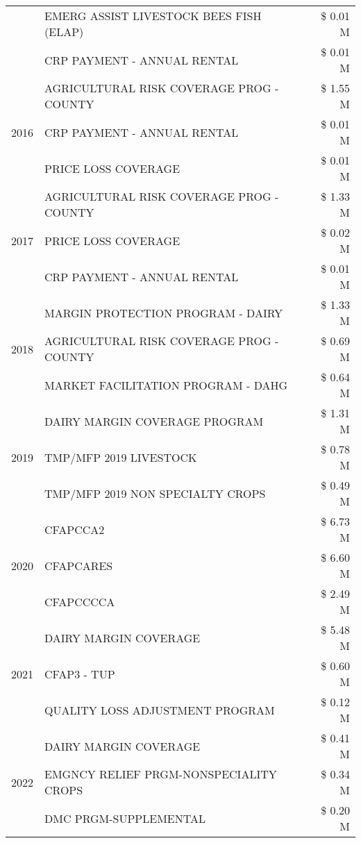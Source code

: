 \begin{tabular}{llr}
 & EMERG ASSIST LIVESTOCK BEES FISH (ELAP) & \$ 0.01 M \\
 & CRP PAYMENT - ANNUAL RENTAL & \$ 0.01 M \\
\cline{1-3}
\multirow[t]{3}{*}{2016} & AGRICULTURAL RISK COVERAGE PROG - COUNTY & \$ 1.55 M \\
 & CRP PAYMENT - ANNUAL RENTAL & \$ 0.01 M \\
 & PRICE LOSS COVERAGE & \$ 0.01 M \\
\cline{1-3}
\multirow[t]{3}{*}{2017} & AGRICULTURAL RISK COVERAGE PROG - COUNTY & \$ 1.33 M \\
 & PRICE LOSS COVERAGE & \$ 0.02 M \\
 & CRP PAYMENT - ANNUAL RENTAL & \$ 0.01 M \\
\cline{1-3}
\multirow[t]{3}{*}{2018} & MARGIN PROTECTION PROGRAM - DAIRY & \$ 1.33 M \\
 & AGRICULTURAL RISK COVERAGE PROG - COUNTY & \$ 0.69 M \\
 & MARKET FACILITATION PROGRAM - DAHG & \$ 0.64 M \\
\cline{1-3}
\multirow[t]{3}{*}{2019} & DAIRY MARGIN COVERAGE PROGRAM & \$ 1.31 M \\
 & TMP/MFP 2019 LIVESTOCK & \$ 0.78 M \\
 & TMP/MFP 2019 NON SPECIALTY CROPS & \$ 0.49 M \\
\cline{1-3}
\multirow[t]{3}{*}{2020} & CFAPCCA2 & \$ 6.73 M \\
 & CFAPCARES & \$ 6.60 M \\
 & CFAPCCCCA & \$ 2.49 M \\
\cline{1-3}
\multirow[t]{3}{*}{2021} & DAIRY MARGIN COVERAGE & \$ 5.48 M \\
 & CFAP3 - TUP & \$ 0.60 M \\
 & QUALITY LOSS ADJUSTMENT PROGRAM & \$ 0.12 M \\
\cline{1-3}
\multirow[t]{3}{*}{2022} & DAIRY MARGIN COVERAGE & \$ 0.41 M \\
 & EMGNCY RELIEF PRGM-NONSPECIALITY CROPS & \$ 0.34 M \\
 & DMC PRGM-SUPPLEMENTAL & \$ 0.20 M \\
\cline{1-3}
\bottomrule
\end{tabular}
